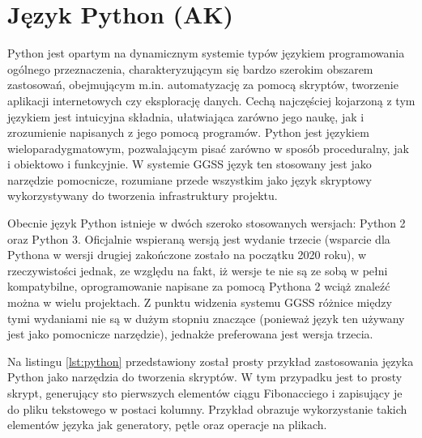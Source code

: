 \section{Język Python (AK)}
Python jest opartym na dynamicznym systemie typów językiem programowania ogólnego przeznaczenia, charakteryzującym się bardzo szerokim obszarem zastosowań, obejmującym m.in. automatyzację za pomocą skryptów, tworzenie aplikacji internetowych czy eksplorację danych. Cechą najczęściej kojarzoną z tym językiem jest intuicyjna składnia, ułatwiająca zarówno jego naukę, jak i zrozumienie napisanych z jego pomocą programów. Python jest językiem wieloparadygmatowym, pozwalającym pisać zarówno w sposób proceduralny, jak i obiektowo i funkcyjnie. W systemie GGSS język ten stosowany jest jako narzędzie pomocnicze, rozumiane przede wszystkim jako język skryptowy wykorzystywany do tworzenia infrastruktury projektu.

Obecnie język Python istnieje w dwóch szeroko stosowanych wersjach: Python 2 oraz Python 3. Oficjalnie wspieraną wersją jest wydanie trzecie (wsparcie dla Pythona w wersji drugiej zakończone zostało na początku 2020 roku), w rzeczywistości jednak, ze względu na fakt, iż wersje te nie są ze sobą w pełni kompatybilne, oprogramowanie napisane za pomocą Pythona 2 wciąż znaleźć można w wielu projektach. Z punktu widzenia systemu GGSS różnice między tymi wydaniami nie są w dużym stopniu znaczące (ponieważ język ten używany jest jako pomocnicze narzędzie), jednakże preferowana jest wersja trzecia.

Na listingu \ref{lst:python} przedstawiony został prosty przykład zastosowania języka Python jako narzędzia do tworzenia skryptów. W tym przypadku jest to prosty skrypt, generujący sto pierwszych elementów ciągu Fibonacciego i zapisujący je do pliku tekstowego w postaci kolumny. Przykład obrazuje wykorzystanie takich elementów języka jak generatory, pętle oraz operacje na plikach.





